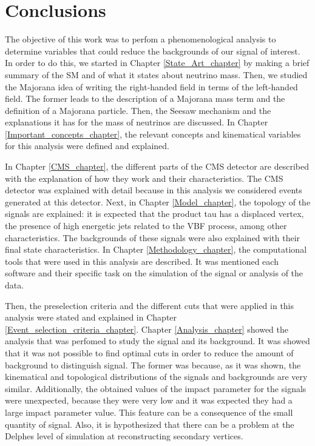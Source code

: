 \chapter{Conclusions} 
\label{Conclusion_chapter}

The objective of this work was to perfom a phenomenological analysis to determine variables that could reduce the backgrounds of our signal of interest. In order to do this, we started in Chapter \ref{State_Art_chapter} by making a brief summary of the SM and of what it states about neutrino mass. Then, we studied the Majorana idea of writing the right-handed field in terms of the left-handed field. The former leads to the description of a Majorana mass term and the definition of a Majorana particle. Then, the Seesaw mechanism and the explanations it has for the mass of neutrinos are discussed. In Chapter \ref{Important_concepts_chapter}, the relevant concepts and kinematical variables for this analysis were defined and explained.

In Chapter \ref{CMS_chapter}, the different parts of the CMS detector are described with the explanation of how they work and their characteristics. The CMS detector was explained with detail because in this analysis we considered events generated at this detector. Next, in Chapter \ref{Model_chapter}, the topology of the signals are explained: it is expected that the product tau has a displaced vertex, the presence of high energetic jets related to the VBF process, among other characteristics. The backgrounds of these signals were also explained with their final state characteristics. In Chapter \ref{Methodology_chapter}, the computational tools that were used in this analysis are described. It was mentioned each software and their specific task on the simulation of the signal or analysis of the data.  

Then, the preselection criteria and the different cuts that were applied in this analysis were stated and explained in Chapter \ref{Event_selection_criteria_chapter}. Chapter \ref{Analysis_chapter} showed the analysis that was perfomed to study the signal and its background. It was showed that it was not possible to find optimal cuts in order to reduce the amount of background to distinguish signal. The former was because, as it was shown, the kinematical and topological distributions of the signals and backgrounds are very similar.
Additionally, the obtained values of the impact parameter for the signals were unexpected, because they were very low and it was expected they had a large impact parameter value. This feature can be a consequence of the small quantity of signal. Also, it is hypothesized that there can be a problem at the Delphes level of simulation at reconstructing secondary vertices.



